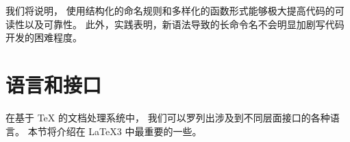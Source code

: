 \documentclass{l3doc}
\begin{document}
我们将说明，
使用结构化的命名规则和多样化的函数形式能够极大提高代码的可读性以及可靠性。
此外，实践表明，新语法导致的长命令名不会明显加剧写代码开发的困难程度。

%
\section{语言和接口}
%
%

在基于 \TeX{} 的文档处理系统中，
我们可以罗列出涉及到不同层面接口的各种语言。
本节将介绍在 \LaTeX3 中最重要的一些。
\end{document}
